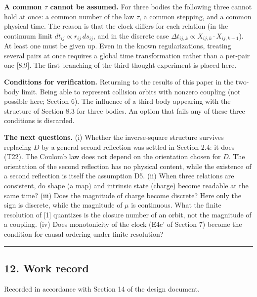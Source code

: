 \documentclass[
  a4paper,
]{article}
\begin{document}
\textbf{A common \(\tau\) cannot be assumed.} For three bodies the
following three cannot hold at once: a common number of the law
\(\tau\), a common stepping, and a common physical time. The reason is
that the clock differs for each relation (in the continuum limit
\(dt_{ij}\propto r_{ij}\,ds_{ij}\), and in the discrete case
\(\Delta t_{ij,k}\propto X_{ij,k}\cdot X_{ij,k+1}\)). At least one must
be given up. Even in the known regularizations, treating several pairs
at once requires a global time transformation rather than a per-pair one
{[}8,9{]}. The first branching of the third thought experiment is placed
here.

\textbf{Conditions for verification.} Returning to the results of this
paper in the two-body limit. Being able to represent collision orbits
with nonzero coupling (not possible here; Section 6). The influence of a
third body appearing with the structure of Section 8.3 for three bodies.
An option that fails any of these three conditions is discarded.

\textbf{The next questions.} (i) Whether the inverse-square structure
survives replacing \(D\) by a general second reflection was settled in
Section 2.4: it does (T22). The Coulomb law does not depend on the
orientation chosen for \(D\). The orientation of the second reflection
has no physical content, while the existence of a second reflection is
itself the assumption D5. (ii) When three relations are consistent, do
shape (a map) and intrinsic state (charge) become readable at the same
time? (iii) Does the magnitude of charge become discrete? Here only the
sign is discrete, while the magnitude of \(\mu\) is continuous. What the
finite resolution of {[}1{]} quantizes is the closure number of an
orbit, not the magnitude of a coupling. (iv) Does monotonicity of the
clock (E4c' of Section 7) become the condition for causal ordering under
finite resolution?

\begin{center}\rule{0.5\linewidth}{0.5pt}\end{center}

\subsection{12. Work record}\label{work-record}

Recorded in accordance with Section 14 of the design document.
\end{document}
